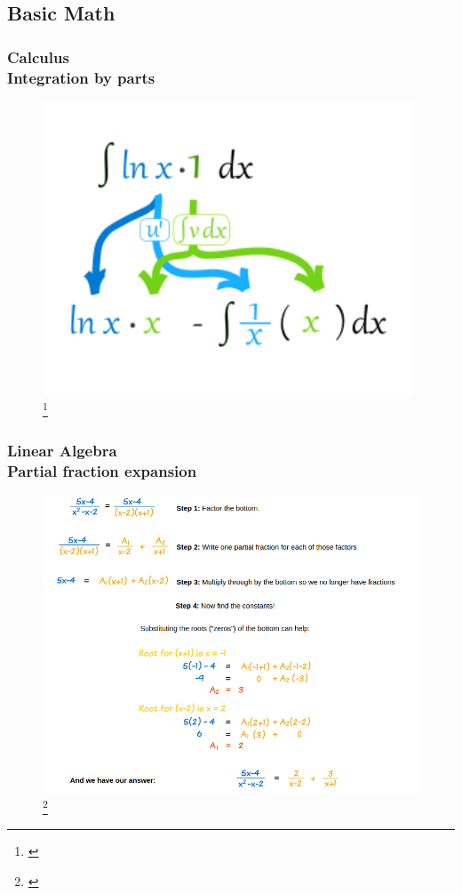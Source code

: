 \documentclass[hyperref={pdfpagelabels=true}]{beamer}
\begin{document}
\subsection{Basic Math}
\begin{frame}
\frametitle{Calculus \\ {\large Integration by parts}}
\begin{figure}[!tbp]
\centering
\includegraphics[scale = 0.35]{figs/ab.png}
\footnote{\href{http://www.mathsisfun.com/calculus/integration-by-parts.html}{}}
\end{figure}
\end{frame}
\begin{frame}
\frametitle{Linear Algebra \\ {\large Partial fraction expansion}}
\begin{figure}[!tbp]
\centering
\includegraphics[scale = 0.3]{figs/Selection_012.png}
\footnote{\href{http://www.mathsisfun.com/calculus/integration-by-parts.html}{}}
\end{figure}
\end{frame}
\end{document}
